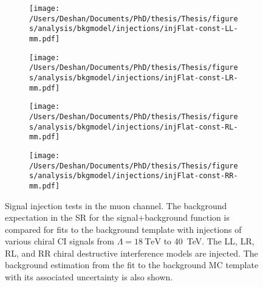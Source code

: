 \begin{figure}[h!]
    \centering
    \begin{subfigure}[b]{0.49\textwidth}
        \centering
        \texttt{[image: /Users/Deshan/Documents/PhD/thesis/Thesis/figures/analysis/bkgmodel/injections/injFlat-const-LL-mm.pdf]}
        \label{fig:bkgmodel:injmm1}
    \end{subfigure}
    \begin{subfigure}[b]{0.49\textwidth}
        \centering
        \texttt{[image: /Users/Deshan/Documents/PhD/thesis/Thesis/figures/analysis/bkgmodel/injections/injFlat-const-LR-mm.pdf]}
        \label{fig:bkgmodel:injmm3}
    \end{subfigure}
    \begin{subfigure}[b]{0.49\textwidth}
        \centering
        \texttt{[image: /Users/Deshan/Documents/PhD/thesis/Thesis/figures/analysis/bkgmodel/injections/injFlat-const-RL-mm.pdf]}
        \label{fig:bkgmodel:injmm5}
    \end{subfigure}
    \begin{subfigure}[b]{0.49\textwidth}
        \centering
        \texttt{[image: /Users/Deshan/Documents/PhD/thesis/Thesis/figures/analysis/bkgmodel/injections/injFlat-const-RR-mm.pdf]}
        \label{fig:bkgmodel:injmm7}
    \end{subfigure}
    \caption[Signal injection tests in the muon channel for destructive interference models]{Signal injection tests in the muon channel. The background expectation in the SR for the signal+background function is compared for fits to the background template with injections of various chiral CI signals from $\Lambda = \SI{18}{\tera\electronvolt}$ to \SI{40}{\tera\electronvolt}. The LL, LR, RL, and RR chiral destructive interference models are injected. The background estimation from the fit to the background MC template with its associated uncertainty is also shown.}
    \label{fig:bkgmodel:injmmconst}
\end{figure}

